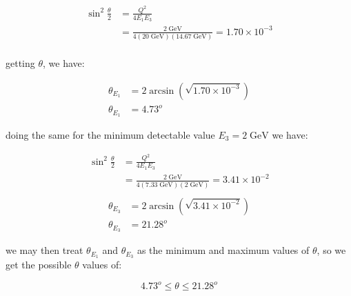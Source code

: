\documentclass[11pt]{article}
\theoremstyle{definition}
\begin{document}
\begin{align}
    \sin^2\frac{\theta}{2} &= \frac{Q^2}{4E_1E_3}\\
   &= \frac{2\;\text{GeV}}{4(20\;\text{GeV})(14.67\;\text{GeV})} = 1.70\times 10^{-3}\\
\end{align}

getting $\theta$, we have:

\begin{align}
    \theta_{E_1} &= 2\arcsin(\sqrt{1.70\times 10^{-3}})\\
    \theta_{E_1} &= 4.73^o
\end{align}

doing the same for the minimum detectable value $E_3 = 2\;\text{GeV}$ we have:

\begin{align}
    \sin^2\frac{\theta}{2} &= \frac{Q^2}{4E_1E_3}\\
   &= \frac{2\;\text{GeV}}{4(7.33\;\text{GeV})(2\;\text{GeV})} = 3.41\times 10^{-2}\\
\end{align}
\begin{align}
    \theta_{E_3} &= 2\arcsin(\sqrt{3.41\times 10^{-2}})\\
    \theta_{E_3} &= 21.28^o
\end{align}

we may then treat $\theta_{E_1}$ and $\theta_{E_3}$ as the minimum and maximum values of $\theta$, so we get the possible $\theta$ values of:

\begin{equation}
\boxed{
    4.73^o \leq \theta \leq 21.28^o
}
\end{equation}
\end{document}
